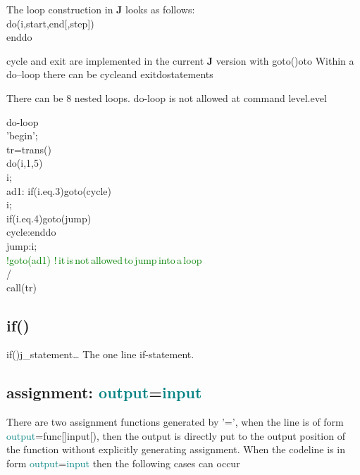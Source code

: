The loop construction in \textbf{J} looks as follows:
\\
\textcolor{VioletRed}{do}(i,start,end[,step])
\\
enddo
\\
\begin{note}
cycle and exit are implemented in the current \textbf{J} version with \textcolor{VioletRed}{goto}()oto
Within a do–loop there can be cycleand exitdostatements
\end{note}
\begin{note}
There can be 8 nested loops. do-loop is not allowed at command level.evel
\end{note}
\begin{example}[doex]do-loop\\
\label{doex}
'begin';\\
tr=\textcolor{VioletRed}{trans}()\\
\textcolor{VioletRed}{do}(i,1,5)\\
i;\\
ad1: \textcolor{VioletRed}{if}(i.eq.3)\textcolor{VioletRed}{goto}(cycle)\\
i;\\
\textcolor{VioletRed}{if}(i.eq.4)\textcolor{VioletRed}{goto}(jump)\\
cycle:enddo\\
jump:i;\\
\textcolor{green}{!\textcolor{VioletRed}{goto}(ad1)\,\,!\,it\,is\,not\,allowed\,to\,jump\,into\,a\,loop}\\
/\\
\textcolor{VioletRed}{call}(tr)
\end{example}
\subsection{\textcolor{VioletRed}{if}()}
\label{if}

\textcolor{VioletRed}{if}()j\_statement… \newline
The one line if-statement.
\subsection{assignment: \textcolor{teal}{output}=\textcolor{teal}{input}}
\label{ASSIGN}
There are two assignment functions generated by '=', when the line is of
form \textcolor{teal}{output}=func[]input[), then the output is directly
put to the output position of the function
without explicitly generating assignment.
When the codeline is in form \textcolor{teal}{output}=\textcolor{teal}{input} then the following cases can occur


